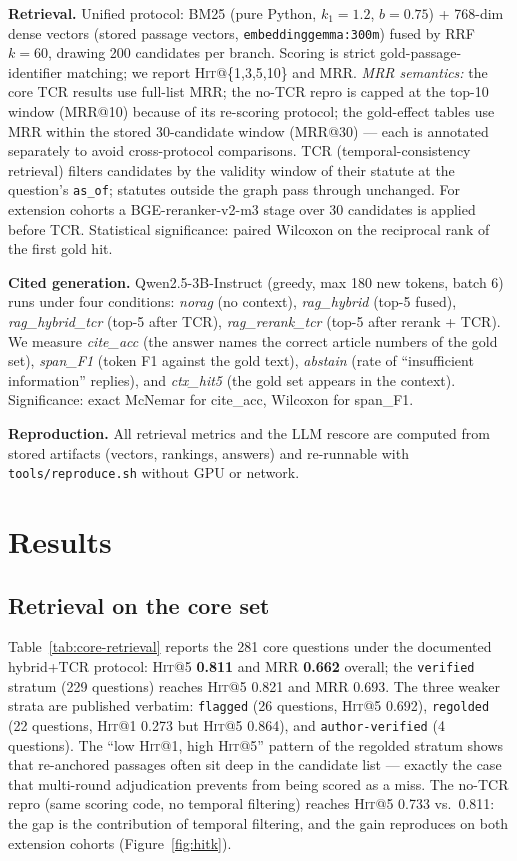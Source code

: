 \documentclass[10pt,a4paper,twocolumn]{article}
\newcommand{\hit}{\textsc{Hit}}
\newcommand{\code}[1]{\texttt{#1}}
\begin{document}
\textbf{Retrieval.} Unified protocol: BM25 (pure Python, $k_1{=}1.2$, $b{=}0.75$) + 768-dim dense vectors (stored passage vectors, \code{embeddinggemma:300m}) fused by RRF $k{=}60$, drawing 200 candidates per branch. Scoring is strict gold-passage-identifier matching; we report \hit{}@\{1,3,5,10\} and MRR. \emph{MRR semantics:} the core TCR results use full-list MRR; the no-TCR repro is capped at the top-10 window (MRR@10) because of its re-scoring protocol; the gold-effect tables use MRR within the stored 30-candidate window (MRR@30) --- each is annotated separately to avoid cross-protocol comparisons. TCR (temporal-consistency retrieval) filters candidates by the validity window of their statute at the question's \code{as\_of}; statutes outside the graph pass through unchanged. For extension cohorts a BGE-reranker-v2-m3 stage over 30 candidates is applied before TCR. Statistical significance: paired Wilcoxon on the reciprocal rank of the first gold hit.

\textbf{Cited generation.} Qwen2.5-3B-Instruct (greedy, max 180 new tokens, batch 6) runs under four conditions: \emph{norag} (no context), \emph{rag\_hybrid} (top-5 fused), \emph{rag\_hybrid\_tcr} (top-5 after TCR), \emph{rag\_rerank\_tcr} (top-5 after rerank + TCR). We measure \emph{cite\_acc} (the answer names the correct article numbers of the gold set), \emph{span\_F1} (token F1 against the gold text), \emph{abstain} (rate of ``insufficient information'' replies), and \emph{ctx\_hit5} (the gold set appears in the context). Significance: exact McNemar for cite\_acc, Wilcoxon for span\_F1.

\textbf{Reproduction.} All retrieval metrics and the LLM rescore are computed from stored artifacts (vectors, rankings, answers) and re-runnable with \code{tools/reproduce.sh} without GPU or network.

\section{Results}

\subsection{Retrieval on the core set}

Table~\ref{tab:core-retrieval} reports the 281 core questions under the documented hybrid+TCR protocol: \hit{}@5 \textbf{0.811} and MRR \textbf{0.662} overall; the \code{verified} stratum (229 questions) reaches \hit{}@5 0.821 and MRR 0.693. The three weaker strata are published verbatim: \code{flagged} (26 questions, \hit{}@5 0.692), \code{regolded} (22 questions, \hit{}@1 0.273 but \hit{}@5 0.864), and \code{author-verified} (4 questions). The ``low \hit{}@1, high \hit{}@5'' pattern of the regolded stratum shows that re-anchored passages often sit deep in the candidate list --- exactly the case that multi-round adjudication prevents from being scored as a miss. The no-TCR repro (same scoring code, no temporal filtering) reaches \hit{}@5 0.733 vs.\ 0.811: the gap is the contribution of temporal filtering, and the gain reproduces on both extension cohorts (Figure~\ref{fig:hitk}).
\end{document}
